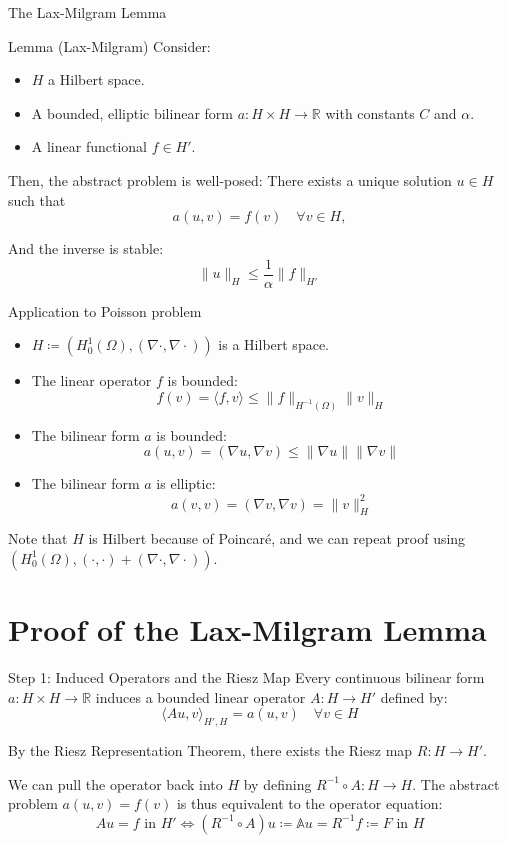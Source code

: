 \documentclass[aspectratio=169]{beamer}
\begin{document}
\begin{frame}{The Lax-Milgram Lemma}
    \begin{block}{Lemma (Lax-Milgram)}
    Consider: 
    \begin{itemize}
        \item $H$ a Hilbert space. 
        \item A bounded, elliptic bilinear form $a : H \times H \to \mathbb{R}$ with constants $C$ and $\alpha$. 
        \item A linear functional $f \in H'$.
    \end{itemize}

        Then, the abstract problem is well-posed: There exists a unique solution $u \in H$ such that
        $$ a(u, v) = f(v) \quad \forall v \in H, $$

        And the inverse is stable:
        $$ \|u\|_H \le \frac{1}{\alpha}\|f\|_{H'} $$
\end{block}
\end{frame}


\begin{frame}{Application to Poisson problem}
    \begin{itemize}
        \item $H\coloneqq (H_0^1(\Omega), (\nabla \cdot, \nabla \cdot))$ is a Hilbert space.
        \item The linear operator $f$ is bounded: 
            $$ f(v) = \langle f, v\rangle \leq \| f \|_{H^{-1}(\Omega)} \| v \|_H $$
        \item The bilinear form $a$ is bounded:
            $$ a(u,v) = (\nabla u, \nabla v) \leq \| \nabla u \| \| \nabla v \| $$
        \item The bilinear form $a$ is elliptic:
            $$ a(v,v) = (\nabla v, \nabla v) = \| v \|^2_H $$
    \end{itemize}
    Note that $H$ is Hilbert because of Poincaré, and we can repeat proof using $(H_0^1(\Omega), (\cdot, \cdot) + (\nabla \cdot, \nabla \cdot)) $. 
\end{frame}

\section{Proof of the Lax-Milgram Lemma}

\begin{frame}{Step 1: Induced Operators and the Riesz Map}
    Every continuous bilinear form $a: H \times H \to \mathbb{R}$ induces a bounded linear operator $A: H \to H'$ defined by:
    $$ \langle Au, v \rangle_{H', H} = a(u, v) \quad \forall v \in H $$

    By the Riesz Representation Theorem, there exists the Riesz map $R: H \to H'$.

    \vspace{0.3cm}
    We can pull the operator back into $H$ by defining $R^{-1} \circ A : H \to H$. The abstract problem $a(u,v) = f(v)$ is thus equivalent to the operator equation:
    $$ Au = f \text{ in } H' \iff (R^{-1} \circ A)u \coloneqq \mathbb A u = R^{-1}f \coloneqq F \text{ in } H $$
\end{frame}
\end{document}
